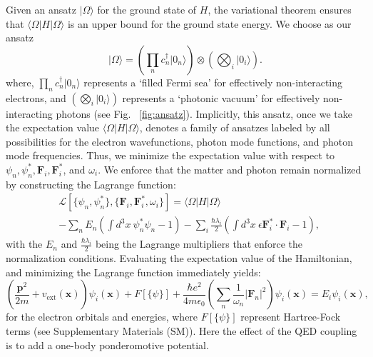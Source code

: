 \documentclass[aps,prl,twocolumn,
	groupedaddress,superscriptaddress,
	amsfonts,amssymb,amsmath,floatfix,
	citeautoscript]{revtex4-1}
\begin{document}
Given an ansatz $|\Omega\rangle$ for the ground state of $H$, the variational theorem ensures that $\langle \Omega|H|\Omega\rangle$ is an upper bound for the ground state energy. We choose as our ansatz
\begin{equation}
|\Omega\rangle = \left( \prod\limits_n c_n^{\dagger}|0_n\rangle\right) \otimes \left(\bigotimes_i|0_i\rangle\right).
\label{eq:ansatz}
\end{equation}
where, $\prod\limits_n c_n^{\dagger}|0_n\rangle$ represents a `filled Fermi sea' for effectively non-interacting electrons, and $\left(\bigotimes_i|0_i\rangle\right)$ represents a `photonic vacuum' for effectively non-interacting photons (see Fig. ~\ref{fig:ansatz}). Implicitly, this ansatz, once we take the expectation value $\langle \Omega|H|\Omega\rangle$, denotes a family of ansatzes labeled by all possibilities for the electron wavefunctions,  photon mode functions, and photon mode frequencies. Thus, we minimize the expectation value with respect to $\psi_n, \psi_n^*, \mathbf{F}_i, \mathbf{F}_i^*$, and $\omega_i$.  We enforce that the matter and photon remain normalized by constructing the Lagrange function:
\begin{align}
&\mathcal{L}[\{ \psi_n,\psi_n^* \},\{ \mathbf{F}_i,\mathbf{F}_i^*,\omega_i \}] = \langle \Omega |H|\Omega\rangle \\
&- \sum_n E_n\left(\int d^3x ~\psi_n^*\psi_n - 1 \right) - \sum_i \frac{\hbar\lambda_i}{2}\left(\int d^3x ~\epsilon\mathbf{F}_i^*\cdot\mathbf{F}_i - 1 \right),\nonumber
\end{align}
with the $E_n$ and $\frac{\hbar\lambda_i}{2}$ being the Lagrange multipliers that enforce the normalization conditions. Evaluating the expectation value of the Hamiltonian, and minimizing the Lagrange function  immediately yields:
\begin{equation}
\left(\frac{\mathbf{p}^2}{2m}+v_{\mathrm{ext}}(\mathbf{x}) \right)\psi_i(\mathbf{x}) + F[\{ \psi \}] + \frac{\hbar e^2}{4m\epsilon_0}\left(\sum_n \frac{1}{\omega_n}|\mathbf{F}_n|^2\right)\psi_i(\mathbf{x})   = E_i\psi_i(\mathbf{x}),
\label{eq:mhf-electron}
\end{equation}
for the electron orbitals and energies, where $F[\{ \psi \}]$ represent Hartree-Fock terms (see Supplementary Materials (SM)). Here the effect of the QED coupling is to add a one-body ponderomotive potential. %
\end{document}
